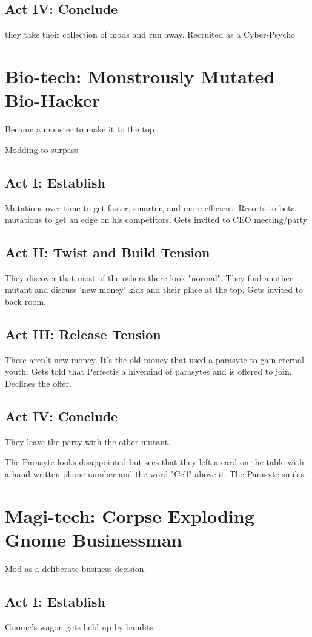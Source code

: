 \documentclass[]{article}
\newcommand{\megacorpB}{Perfect\texttrademark }
\begin{document}
\subsection*{Act IV: Conclude}
they take their collection of mods and run away. Recruited as a Cyber-Psycho

\section{Bio-tech: Monstrously Mutated Bio-Hacker}
Became a monster to make it to the top

Modding to surpass
\subsection*{Act I: Establish}
Mutations over time to get faster, smarter, and more efficient. Resorts to beta mutations to get an edge on his competitors. Gets invited to CEO meeting/party
\subsection*{Act II: Twist and Build Tension}
They discover that most of the others there look "normal". They find another mutant and discuss 'new money' kids and their place at the top. Gets invited to back room.
\subsection*{Act III: Release Tension}
These aren't new money. It's the old money that used a parasyte to gain eternal youth. Gets told that \megacorpB is a hivemind of parasytes and is offered to join. Declines the offer.
\subsection*{Act IV: Conclude}
They leave the party with the other mutant. 

The Parasyte looks disappointed but sees that they left a card on the table with a hand written phone number and the word "Cell" above it. The Parasyte smiles.

\section{Magi-tech: Corpse Exploding Gnome Businessman}
Mod as a deliberate business decision.
\subsection*{Act I: Establish}
Gnome's wagon gets held up by bandits
\end{document}
